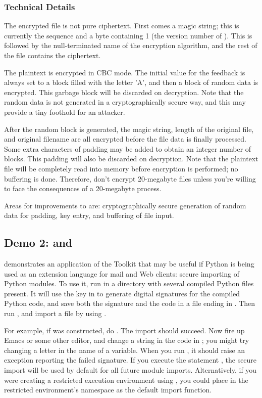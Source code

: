 \documentclass{howto}
\begin{document}
\subsubsection{Technical Details}

The encrypted file is not pure ciphertext.  First comes a magic
string; this is currently the sequence  and a byte
containing 1 (the version number of ).
This is followed by the null-terminated name of the encryption
algorithm, and the rest of the file contains the ciphertext.  

The plaintext is encrypted in CBC mode.  The initial value for the
feedback is always set to a block filled with the letter 'A', and then
a block of random data is encrypted.  This garbage block will be
discarded on decryption.  Note that the random data is not generated
in a cryptographically secure way, and this may provide a tiny foothold for
an attacker.

After the random block is generated, the magic string, length of the
original file, and original filename are all encrypted before the file
data is finally processed.  Some extra characters of padding may be
added to obtain an integer number of blocks.  This padding will also
be discarded on decryption.  Note that the plaintext file will be
completely read into memory before encryption is performed; no
buffering is done.  Therefore, don't encrypt 20-megabyte files unless
you're willing to face the consequences of a 20-megabyte process.

Areas for improvements to  are: cryptographically secure
generation of random data
for padding, key entry, and buffering of file
input.

\subsection{Demo 2:  and }

 demonstrates an application of the Toolkit that may be
useful if Python is being used as an extension language for mail and Web
clients: secure importing of Python modules.  To use it, run
 in a directory with several compiled Python files
present.  It will use the key in  to generate digital
signatures for the compiled Python code, and save both the signature and
the code in a file ending in .  Then run , and import a file by using .  

For example, if  was constructed, do
.  The import should succeed.  Now fire up Emacs
or some other editor, and change a string in the code in ;
you might try changing a letter in the name of a variable.  When you run
, it should raise an exception reporting the
failed signature.  If you execute the statement , the secure import will be used by default for all future
module imports.  Alternatively, if you were creating a restricted
execution environment using , you could place
 in the restricted environment's namespace as the
default import function.
\end{document}
